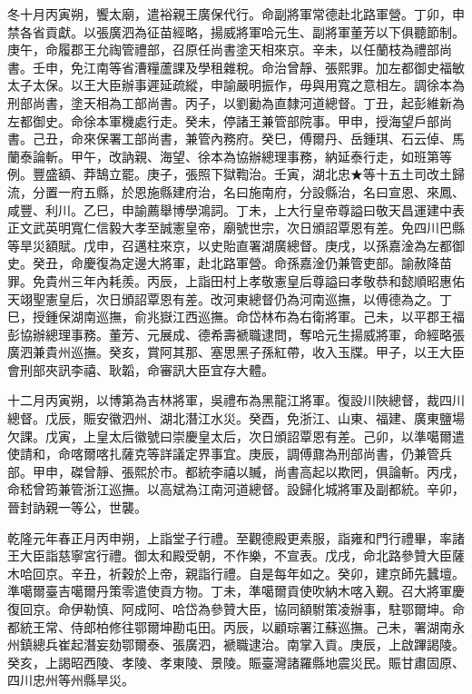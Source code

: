 \begin{pinyinscope}
冬十月丙寅朔，饗太廟，遣裕親王廣保代行。命副將軍常德赴北路軍營。丁卯，申禁各省貢獻。以張廣泗為征苗經略，揚威將軍哈元生、副將軍董芳以下俱聽節制。庚午，命履郡王允祹管禮部，召原任尚書塗天相來京。辛未，以任蘭枝為禮部尚書。壬申，免江南等省漕糧蘆課及學租雜稅。命治曾靜、張熙罪。加左都御史福敏太子太保。以王大臣辦事遲延疏縱，申諭嚴明振作，毋與用寬之意相左。調徐本為刑部尚書，塗天相為工部尚書。丙子，以劉勷為直隸河道總督。丁丑，起彭維新為左都御史。命徐本軍機處行走。癸未，停諸王兼管部院事。甲申，授海望戶部尚書。己丑，命來保署工部尚書，兼管內務府。癸巳，傅爾丹、岳鍾琪、石云倬、馬蘭泰論斬。甲午，改訥親、海望、徐本為協辦總理事務，納延泰行走，如班第等例。豐盛額、莽鵠立罷。庚子，張照下獄鞫治。壬寅，湖北忠★等十五土司改土歸流，分置一府五縣，於恩施縣建府治，名曰施南府，分設縣治，名曰宣恩、來鳳、咸豐、利川。乙巳，申諭薦舉博學鴻詞。丁未，上大行皇帝尊謚曰敬天昌運建中表正文武英明寬仁信毅大孝至誠憲皇帝，廟號世宗，次日頒詔覃恩有差。免四川巴縣等旱災額賦。戊申，召邁柱來京，以史貽直署湖廣總督。庚戌，以孫嘉淦為左都御史。癸丑，命慶復為定邊大將軍，赴北路軍營。命孫嘉淦仍兼管吏部。諭赦降苗罪。免貴州三年內耗羨。丙辰，上詣田村上孝敬憲皇后尊謚曰孝敬恭和懿順昭惠佑天翊聖憲皇后，次日頒詔覃恩有差。改河東總督仍為河南巡撫，以傅德為之。丁巳，授鍾保湖南巡撫，俞兆嶽江西巡撫。命岱林布為右衛將軍。己未，以平郡王福彭協辦總理事務。董芳、元展成、德希壽褫職逮問，奪哈元生揚威將軍，命經略張廣泗兼貴州巡撫。癸亥，賞阿其那、塞思黑子孫紅帶，收入玉牒。甲子，以王大臣會刑部夾訊李禧、耿韜，命審訊大臣宜存大體。

十二月丙寅朔，以博第為吉林將軍，吳禮布為黑龍江將軍。復設川陜總督，裁四川總督。戊辰，賑安徽泗州、湖北潛江水災。癸酉，免浙江、山東、福建、廣東鹽場欠課。戊寅，上皇太后徽號曰崇慶皇太后，次日頒詔覃恩有差。己卯，以準噶爾遣使請和，命喀爾喀扎薩克等詳議定界事宜。庚辰，調傅鼐為刑部尚書，仍兼管兵部。甲申，磔曾靜、張熙於巿。都統李禧以贓，尚書高起以欺罔，俱論斬。丙戌，命嵇曾筠兼管浙江巡撫。以高斌為江南河道總督。設歸化城將軍及副都統。辛卯，晉封訥親一等公，世襲。

乾隆元年春正月丙申朔，上詣堂子行禮。至觀德殿更素服，詣雍和門行禮畢，率諸王大臣詣慈寧宮行禮。御太和殿受朝，不作樂，不宣表。戊戌，命北路參贊大臣薩木哈回京。辛丑，祈穀於上帝，親詣行禮。自是每年如之。癸卯，建京師先蠶壇。準噶爾臺吉噶爾丹策零遣使貢方物。丁未，準噶爾貢使吹納木喀入覲。召大將軍慶復回京。命伊勒慎、阿成阿、哈岱為參贊大臣，協同額駙策凌辦事，駐鄂爾坤。命都統王常、侍郎柏修往鄂爾坤勘屯田。丙辰，以顧琮署江蘇巡撫。己未，署湖南永州鎮總兵崔起潛妄劾鄂爾泰、張廣泗，褫職逮治。南掌入貢。庚辰，上啟蹕謁陵。癸亥，上謁昭西陵、孝陵、孝東陵、景陵。賑臺灣諸羅縣地震災民。賑甘肅固原、四川忠州等州縣旱災。


\end{pinyinscope}
